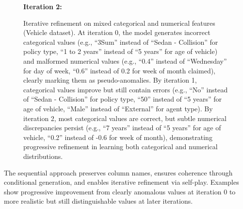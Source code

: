 \begin{figure}[t]
\vspace{4pt}

\textbf{Iteration 2:}
\vspace{1pt}

%

\vspace{1pt}

\hfill
{}

\caption{Iterative refinement on mixed categorical and numerical features (Vehicle dataset). At iteration 0, the model generates incorrect categorical values (e.g., ``3Sum'' instead of ``Sedan - Collision'' for policy type, ``1 to 2 years'' instead of ``5 years'' for age of vehicle) and malformed numerical values (e.g., ``0.4'' instead of ``Wednesday'' for day of week, ``0.6'' instead of 0.2 for week of month claimed), clearly marking them as pseudo-anomalies. By iteration 1, categorical values improve but still contain errors (e.g., ``No'' instead of ``Sedan - Collision'' for policy type, ``50'' instead of ``5 years'' for age of vehicle, ``Male'' instead of ``External'' for agent type). By iteration 2, most categorical values are correct, but subtle numerical discrepancies persist (e.g., ``7 years'' instead of ``5 years'' for age of vehicle, ``0.2'' instead of -0.6 for week of month), demonstrating progressive refinement in learning both categorical and numerical distributions.}
\label{fig:example_vifd}
\end{figure}

The sequential approach preserves column names, ensures coherence through conditional generation, and enables iterative refinement via self-play. Examples show progressive improvement from clearly anomalous values at iteration 0 to more realistic but still distinguishable values at later iterations.




